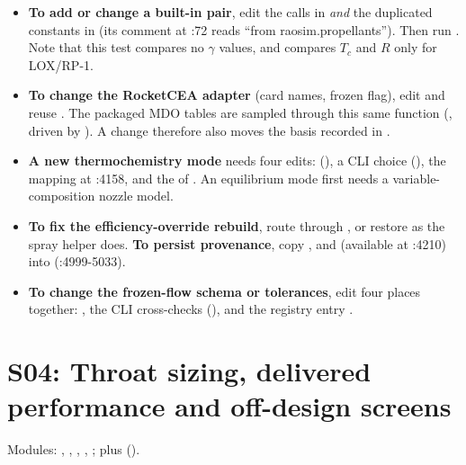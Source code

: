 \begin{itemize}
\item \textbf{To add or change a built-in pair}, edit the  calls in  \emph{and} the duplicated constants in  (its comment at :72 reads ``from raosim.propellants''). Then run . Note that this test compares no $\gamma$ values, and compares $T_c$ and $R$ only for LOX/RP-1.
\item \textbf{To change the RocketCEA adapter} (card names, frozen flag), edit  and reuse . The packaged MDO tables are sampled through this same function (, driven by ). A change therefore also moves the basis recorded in .
\item \textbf{A new thermochemistry mode} needs four edits:  (), a CLI choice (), the mapping at :4158, and the  of . An equilibrium mode first needs a variable-composition nozzle model.
\item \textbf{To fix the efficiency-override rebuild}, route  through , or restore  as the spray helper does. \textbf{To persist provenance}, copy ,  and  (available at :4210) into  (:4999-5033).
\item \textbf{To change the frozen-flow schema or tolerances}, edit four places together: , the CLI cross-checks (),  and the registry entry .
\end{itemize}

\section{S04: Throat sizing, delivered performance and off-design screens}\label{sec:s04}

 \quad Modules: , , , , ; plus  ().

